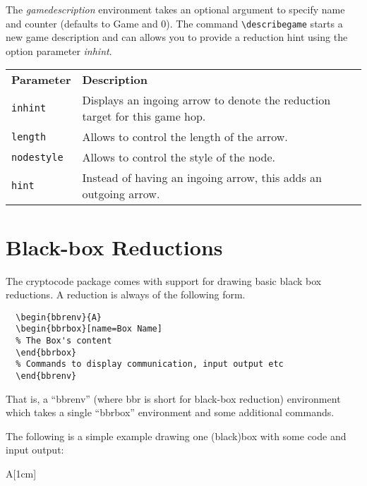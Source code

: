 \documentclass[a4paper]{report}
\begin{document}
  The \emph{gamedescription} environment takes an optional argument to specify name and counter (defaults to Game and 0). The command 
  \lstinline$\describegame$ starts a new game description and can allows you to provide a reduction hint using the option parameter \emph{inhint}.
  
  \begin{center}
  \begin{tabular}{ll}
  \textbf{Parameter} & \textbf{Description} \\
  \lstinline$inhint$ & Displays an ingoing arrow to denote the reduction target for this game hop.\\
  \lstinline$length$ & Allows to control the length of the arrow. \\
  \lstinline$nodestyle$ & Allows to control the style of the node. \\
  \lstinline$hint$ &  Instead of having an ingoing arrow, this adds an outgoing arrow. \\
  \end{tabular}
  \end{center}
  
  
  \chapter{Black-box Reductions}
  \label{chap:bbr}
  
  The cryptocode package comes with support for drawing basic black box reductions. A reduction is
  always of the following form.
  
  \begin{lstlisting}
  \begin{bbrenv}{A}
  \begin{bbrbox}[name=Box Name]
  % The Box's content
  \end{bbrbox}
  % Commands to display communication, input output etc
  \end{bbrenv}
  \end{lstlisting}
  That is, a \enquote{bbrenv} (where bbr is short for black-box reduction) environment which takes a single
  \enquote{bbrbox} environment and some additional commands. 
  
  The following is a simple example drawing one (black)box with some code and input output:
  
  \begin{bbrenv}[1cm]{A}[1cm]
	  \begin{bbrbox}[name=Box Name]
	  \end{bbrbox}
  \end{bbrenv}
  
\end{document}
